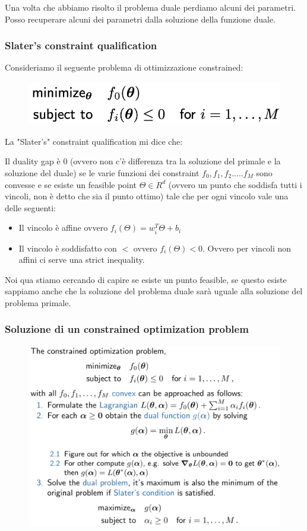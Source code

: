 \documentclass[14pt]{extreport}
\begin{document}
Una volta che abbiamo risolto il problema duale perdiamo alcuni dei parametri. Posso recuperare alcuni dei parametri dalla soluzione della funzione
duale.

\subsubsection{Slater's constraint qualification}

Consideriamo il seguente problema di ottimizzazione constrained:

\begin{figure}[H]
	\centering
	\includegraphics[width=0.7\linewidth]{304.jpeg}
\end{figure}

La "Slater's" constraint qualification mi dice che:

Il duality gap è 0 (ovvero non c'è differenza tra la soluzione del primale e la soluzione del duale) se le varie funzioni dei constraint $f_0, f_1,
	f_2.....f_M$ sono convesse e se esiste un feasible point $\Theta \in R^d$ (ovvero un punto che soddisfa tutti i vincoli, non è detto che sia il
	punto ottimo) tale che per ogni vincolo vale una delle seguenti:
\begin{itemize}
	\item Il vincolo è affine ovvero $f_i(\Theta) = w^T_i\Theta + b_i$
	\item Il vincolo è soddisfatto con $<$ ovvero $f_i(\Theta)<0$. Ovvero per vincoli non affini ci serve una strict inequality.
\end{itemize}

Noi qua stiamo cercando di capire se esiste un punto feasible, se questo esiste sappiamo anche che la soluzione del problema duale sarà uguale alla
soluzione del problema primale.


\subsubsection{Soluzione di un constrained optimization problem}

\begin{figure}[H]
	\centering
	\includegraphics[width=0.7\linewidth]{305.jpeg}
\end{figure}
\end{document}
